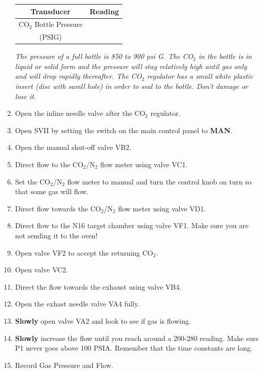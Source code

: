 \begin{enumerate}
\begin{center}
\begin{tabular}{|c|c|}
\hline
Transducer & Reading \\
\hline
CO$_{2}$ Bottle Pressure & \\
(PSIG) & \\
\hline
\end{tabular}
\end{center}
{\it The pressure of a full bottle is 850 to 900 psi G. The CO$_{2}$ in the bottle is in liquid or solid form and the pressure will stay relatively high until gas only and will drop rapidly thereafter. The CO$_{2}$ regulator has a small white plastic insert (disc with samll hole) in order to seal to the bottle. Don't damage or lose it.}
\item \CheckBox[name=gbsp13]{} Open the inline needle valve after the CO$_2$ regulator.
\item \CheckBox[name=gbsp14]{} Open SVII by setting the switch on the main control panel to {\bf MAN}.
\item \CheckBox[name=gbsp15]{} Open the manual shut-off valve VB2.
\item \CheckBox[name=gbsp16]{} Direct flow to the CO$_2$/N$_2$ flow meter using valve VC1.
\item \CheckBox[name=gbsp17]{} Set the CO$_2$/N$_2$ flow meter to manual and turn the control knob on turn so that some gas will flow.
\item \CheckBox[name=gbsp18]{} Direct flow towards the CO$_2$/N$_2$ flow meter using valve VD1.
\item \CheckBox[name=gbsp19]{} Direct flow to the N16 target chamber using valve VF1. Make sure you are not sending it to the oven!
\item \CheckBox[name=gbsp20]{} Open valve VF2 to accept the returning CO$_2$.
\item \CheckBox[name=gbsp21]{} Open valve VC2.
\item \CheckBox[name=gbsp22]{} Direct the flow towards the exhaust using valve VB4.
\item \CheckBox[name=gbsp23]{} Open the exhast needle valve VA4 fully.
\item \CheckBox[name=gbsp24]{} {\bf Slowly} open valve VA2 and look to see if gas is flowing.
\item \CheckBox[name=gbsp25]{} {\bf Slowly} increase the flow until you reach around a 200-280 reading. Make sure P1 never goes above 100 PSIA. Remember that the time constants are long.
\item \CheckBox[name=gbsp26]{} Record Gas Pressure and Flow.

\end{enumerate}
